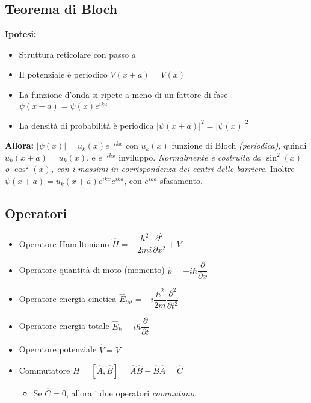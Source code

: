 \documentclass{article}
\begin{document}
\subsection{Teorema di Bloch}
\textbf{Ipotesi:}
\begin{itemize}
  \item Struttura reticolare con passo \( a \)
  \item Il potenziale è periodico \( V(x+a) = V(x) \)
  \item La funzione d'onda si ripete a meno di un fattore di fase \( \psi(x+a) = \psi(x) e^{ i k  a} \)
  \item La densità di probabilità è periodica \( \left| \psi(x+a) \right|^2 = \left| \psi(x)  \right|^2 \)
\end{itemize}
\textbf{Allora:} \( \left| \psi(x) \right| = u_k(x) e^{ -ikx } \) con \( u_k(x) \) funzione di Bloch \textit{(periodica)}, quindi \( u_k (x+a) = u_k(x).\) e \( e^{ -ikx } \) inviluppo.
\newline
\textit{Normalmente è costruita da \(\sin^2(x)\) o \(\cos^2(x)\), con i massimi in corrispondenza dei centri delle barriere}. \newline
\smallskip
Inoltre \( \psi(x+a) = u_k (x+a) e^{ikx} e^{ika} \), con \( e^{ika} \) sfasamento.

\subsection{Operatori}
\begin{itemize}
  \item Operatore Hamiltoniano \( \hat{H} = - \dfrac{\hbar ^ 2}{2mi} \dfrac{\partial ^ 2}{\partial x ^ 2} + V \)
  \item Operatore quantità di moto (momento) \( \hat{p} = -i \hbar \dfrac{\partial}{\partial x} \)
  \item Operatore energia cinetica \( \hat{E}_{tot} = -i \dfrac{\hbar ^ 2}{2m} \dfrac{\partial ^ 2}{\partial t ^ 2} \)
  \item Operatore energia totale \( \hat{E}_k = i \hbar \dfrac{\partial }{\partial t} \)
  \item Operatore potenziale \( \hat{V} = V \)
  \item Commutatore \( H = [\hat{A}, \hat{B}] = \hat{A}\hat{B} - \hat{B}\hat{A} = \hat{C} \)
        \begin{itemize}
          \item Se \( \hat{C} = 0 \), allora i due operatori \textit{commutano}.
        \end{itemize}
\end{itemize}
\end{document}
